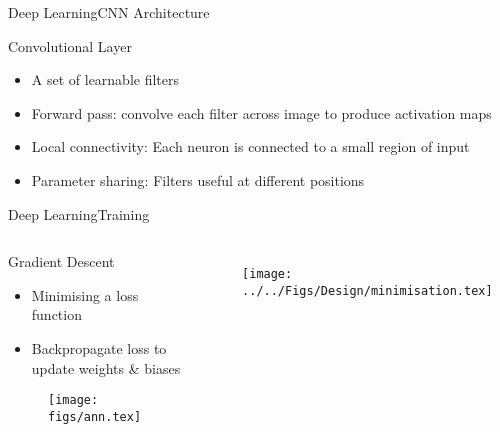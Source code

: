 \begin{frame}{Deep Learning}{CNN Architecture}
    \begin{block}{Convolutional Layer}
        \begin{itemize}
            \item A set of learnable filters
            \item Forward pass: convolve each filter across image to produce activation maps
            \item Local connectivity: Each neuron is connected to a small region of input
            \item Parameter sharing: Filters useful at different positions
        \end{itemize}
    \end{block}
\end{frame}

\begin{frame}{Deep Learning}{Training}
    \begin{columns}
        \begin{block}{Gradient Descent}
            \begin{itemize}
                \item Minimising a loss function
                \item Backpropagate loss to update weights \& biases
            \end{itemize}

            \begin{figure}
                \texttt{[image: figs/ann.tex]}
            \end{figure}

        \end{block}
        \begin{figure}
            \texttt{[image: ../../Figs/Design/minimisation.tex]}
        \end{figure}

    \end{columns}
\end{frame}
